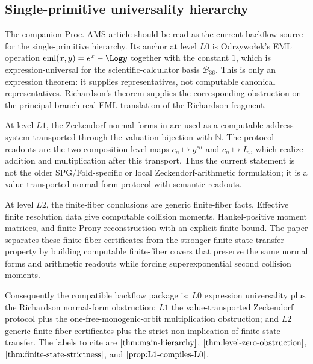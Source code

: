 \subsection{Single-primitive universality hierarchy}\label{subsec:conclusion-backflow-spu-hierarchy}

The companion Proc. AMS article \cite{OmegaHierarchy2026} should be read
as the current backflow source for the single-primitive hierarchy.  Its
anchor at level \(L0\) is Odrzywo{\l}ek's EML operation
\(\mathrm{eml}(x,y)=e^x-\Log y\) together with the constant \(1\), which
is expression-universal for the scientific-calculator basis
\(\mathcal B_{36}\).  This is only an expression theorem: it supplies
representatives, not computable canonical representatives.  Richardson's
theorem supplies the corresponding obstruction on the principal-branch
real EML translation of the Richardson fragment.

At level \(L1\), the Zeckendorf normal forms in \cite{OmegaHierarchy2026}
are used as a computable address system transported through the valuation
bijection with \(\mathbb N\).  The protocol readouts are the two
composition-level maps \(c_n\mapsto g^{\circ n}\) and
\(c_n\mapsto I_n\), which realize addition and multiplication after this
transport.  Thus the current statement is not the older SPG/Fold-specific
or local Zeckendorf-arithmetic formulation; it is a value-transported
normal-form protocol with semantic readouts.

At level \(L2\), the finite-fiber conclusions are generic finite-fiber
facts.  Effective finite resolution data give computable collision
moments, Hankel-positive moment matrices, and finite Prony reconstruction
with an explicit finite bound.  The paper separates these finite-fiber
certificates from the stronger finite-state transfer property by building
computable finite-fiber covers that preserve the same normal forms and
arithmetic readouts while forcing superexponential second collision
moments.

Consequently the compatible backflow package is: \(L0\) expression
universality plus the Richardson normal-form obstruction; \(L1\) the
value-transported Zeckendorf protocol plus the one-free-monogenic-orbit
multiplication obstruction; and \(L2\) generic finite-fiber certificates
plus the strict non-implication of finite-state transfer.  The labels to
cite are \(\Cref{thm:main-hierarchy}\),
\(\Cref{thm:level-zero-obstruction}\),
\(\Cref{thm:finite-state-strictness}\), and
\(\Cref{prop:L1-compiles-L0}\).
